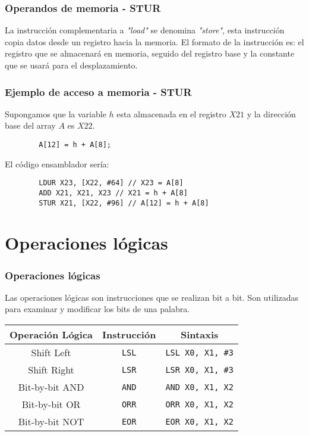\documentclass[aspectradio=43]{beamer}
\begin{document}
\begin{frame}
    \frametitle{Operandos de memoria - STUR}
    La instrucción complementaria a \textit{"load"} se denomina \textit{"store"}, esta instrucción copia datos desde un registro hacia la memoria. El formato de la instrucción es: el registro que se almacenará en memoria, seguido del registro base y la constante que se usará para el desplazamiento.\\
\end{frame}

\begin{frame}[containsverbatim]
    \frametitle{Ejemplo de acceso a memoria - STUR}
    Supongamos que la variable $h$ esta almacenada en el registro \(X21\) y la dirección base del array $A$ es \(X22\).\\
    \begin{verbatim}
        A[12] = h + A[8];
    \end{verbatim}
    El código ensamblador sería:
    \begin{verbatim}
        LDUR X23, [X22, #64] // X23 = A[8]
        ADD X21, X21, X23 // X21 = h + A[8]
        STUR X21, [X22, #96] // A[12] = h + A[8]
    \end{verbatim}
\end{frame}

\section{Operaciones lógicas}
\begin{frame}
    \frametitle{Operaciones lógicas}
    Las operaciones lógicas son instrucciones que se realizan bit a bit. Son utilizadas para examinar y modificar los bits de una palabra.
    \begin{table}
        \begin{tabular}{|c|c|c|}
            \hline
            \rowcolor{orange!20}
            \textbf{Operación Lógica} & \textbf{Instrucción} & \textbf{Sintaxis} \\
            \hline
            Shift Left & \texttt{LSL} & \texttt{LSL X0, X1, \#3} \\
            Shift Right & \texttt{LSR} & \texttt{LSR X0, X1, \#3} \\
            Bit-by-bit AND & \texttt{AND} & \texttt{AND X0, X1, X2} \\
            Bit-by-bit OR & \texttt{ORR} & \texttt{ORR X0, X1, X2} \\
            Bit-by-bit NOT & \texttt{EOR} & \texttt{EOR X0, X1, X2} \\
            \hline
        \end{tabular}
    \end{table}
\end{frame}
\end{document}
